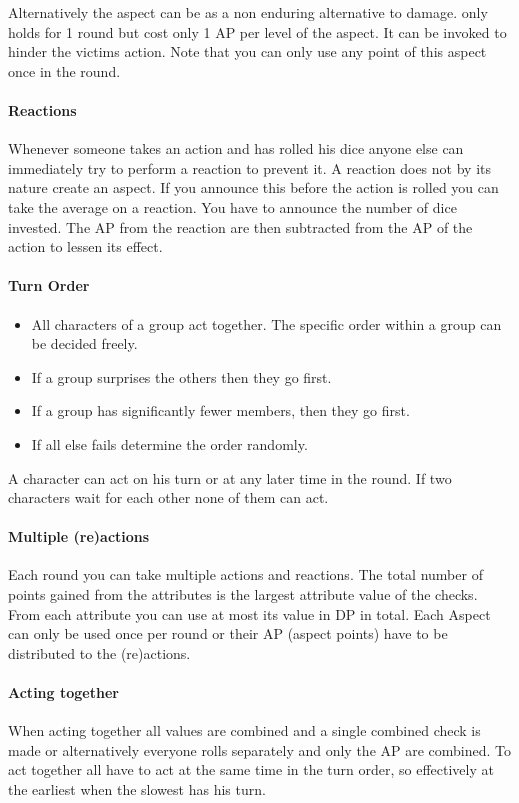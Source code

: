 \documentclass[11pt]{article}
\begin{document}
{Alternatively the aspect can be  as a non enduring alternative to damage.  only holds for 1 round but cost only 1 AP per level of the aspect. It can be invoked to hinder the victims action. Note that you can only use any point of this aspect once in the round. 
\paragraph*{Reactions}
\label{sec:org315890a}
Whenever someone takes an action and has rolled his dice anyone else can immediately try to perform a reaction to prevent it. A reaction does not by its nature create an aspect. If you announce this before the action is rolled you can take the average on a reaction. You have to announce the number of dice invested. The AP from the reaction are then subtracted from the AP of the action to lessen its effect.
\paragraph*{Turn Order}
\label{sec:orgde701a7}
\begin{itemize}
\item All characters of a group act together. The specific order within a group can be decided freely.
\item If a group surprises the others then they go first.
\item If a group has significantly fewer members, then they go first.
\item If all else fails determine the order randomly.
\end{itemize}

A character can act on his turn or at any later time in the round. If two characters wait for each other none of them can act.
\paragraph*{Multiple (re)actions}
\label{sec:orgcbcbfce}
Each round you can take multiple actions and reactions. The total number of points gained from the attributes is the largest attribute value of the checks. From each attribute you can use at most its value in DP in total. Each Aspect can only be used once per round or their AP (aspect points) have to be distributed to the (re)actions.
\paragraph*{Acting together}
\label{sec:org3ddb760}
When acting together all values are combined and a single combined check is made or alternatively everyone rolls separately and only the AP are combined. To act together all have to act at the same time in the turn order, so effectively at the earliest when the slowest has his turn.
}
\end{document}
